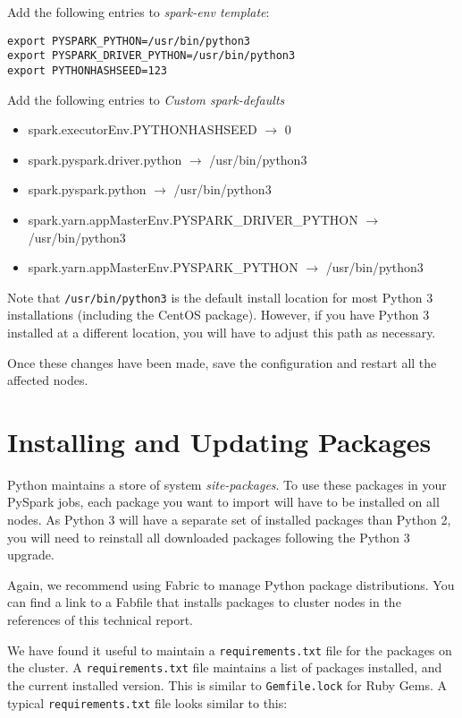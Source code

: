 \documentclass[9pt,twocolumn,twoside]{idsi}
\begin{document}
Add the following entries to \emph{spark-env template}:

\begin{lstlisting}
export PYSPARK_PYTHON=/usr/bin/python3
export PYSPARK_DRIVER_PYTHON=/usr/bin/python3
export PYTHONHASHSEED=123
\end{lstlisting}

Add the following entries to \emph{Custom spark-defaults}
\begin{itemize}
  \item spark.executorEnv.PYTHONHASHSEED $\rightarrow$ 0

  \item spark.pyspark.driver.python $\rightarrow$ /usr/bin/python3

  \item spark.pyspark.python $\rightarrow$ /usr/bin/python3

  \item spark.yarn.appMasterEnv.PYSPARK\_DRIVER\_PYTHON $\rightarrow$ /usr/bin/python3

  \item spark.yarn.appMasterEnv.PYSPARK\_PYTHON $\rightarrow$ /usr/bin/python3
\end{itemize}

Note that \texttt{/usr/bin/python3} is the default install location for most Python 3 installations (including the CentOS package). However, if you have Python 3 installed at a different location, you will have to adjust this path as necessary.

Once these changes have been made, save the configuration and restart all the affected nodes.

\section{Installing and Updating Packages}

Python maintains a store of system \emph{site-packages}. To use these packages in your PySpark jobs, each package you want to import will have to be installed on all nodes. As Python 3 will have a separate set of installed packages than Python 2, you will need to reinstall all downloaded packages following the Python 3 upgrade.

Again, we recommend using Fabric to manage Python package distributions. You can find a link to a Fabfile that installs packages to cluster nodes in the references of this technical report.

We have found it useful to maintain a \texttt{requirements.txt} file for the packages on the cluster. A \texttt{requirements.txt} file maintains a list of packages installed, and the current installed version. This is similar to \texttt{Gemfile.lock} for Ruby Gems. A typical \texttt{requirements.txt} file looks similar to this:
\end{document}
